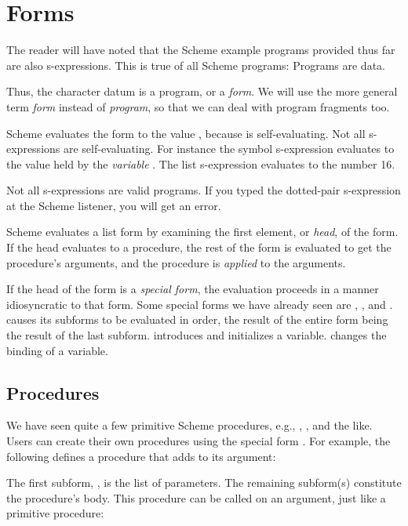 \chapter{Forms}

The reader will have noted that the Scheme example
programs provided thus far are also s-expressions.
This is true of all Scheme programs: Programs are data.

Thus, the character datum \q{#\c} is a program, or a
{\em form}.  We will use the more general term {\em
form} instead of {\em program}, so that we can deal
with program fragments too.

Scheme evaluates the form \q{#\c} to the value \q{#\c},
because \q{#\c} is self-evaluating.  Not all
s-expressions are self-evaluating.  For instance the
symbol s-expression
 evaluates to the value held by the {\em variable}
.  The list s-expression
evaluates to the number 16.

Not all s-expressions are valid programs.  If you typed
the dotted-pair s-expression  at the Scheme
listener, you will get an error.

Scheme evaluates a list form by examining the first
element, or {\em head}, of the form.  If the head
evaluates to a procedure, the rest of the form is
evaluated to get the procedure’s arguments, and the
procedure is {\em applied} to the arguments. 

If the head of the form is a {\em special form}, the
evaluation proceeds in a manner idiosyncratic to that
form.  Some special forms we have already seen
are , , and .   causes its
subforms to be evaluated in order, the result of the
entire form being the result of the last subform.
 introduces and initializes a variable.
 changes the binding of a variable.  

\section{Procedures}

We have seen quite a few primitive Scheme procedures,
e.g., , , and the like.  Users
can create their own procedures using the special form
.  For example, the following defines a
procedure that adds  to its argument:


The first subform, , is the list of parameters.
The remaining subform(s) constitute the procedure’s
body.  This procedure can be called on an argument,
just like a primitive procedure:

